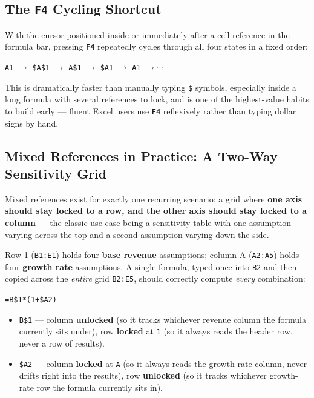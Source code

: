 \documentclass[11pt,a4paper]{article}
\newcommand{\key}[1]{\texttt{\colorbox{black!8}{\textbf{#1}}}}
\begin{document}
\subsection[The F4 Cycling Shortcut]{The \key{F4} Cycling Shortcut}

\begin{protip}
With the cursor positioned inside or immediately after a cell reference in the formula bar, pressing \key{F4} repeatedly cycles through all four states in a fixed order:
\begin{center}
\texttt{A1} $\rightarrow$ \texttt{\$A\$1} $\rightarrow$ \texttt{A\$1} $\rightarrow$ \texttt{\$A1} $\rightarrow$ \texttt{A1} $\rightarrow \cdots$
\end{center}
This is dramatically faster than manually typing \texttt{\$} symbols, especially inside a long formula with several references to lock, and is one of the highest-value habits to build early --- fluent Excel users use \key{F4} reflexively rather than typing dollar signs by hand.
\end{protip}

\subsection{Mixed References in Practice: A Two-Way Sensitivity Grid}

Mixed references exist for exactly one recurring scenario: a grid where \textbf{one axis should stay locked to a row, and the other axis should stay locked to a column} --- the classic use case being a sensitivity table with one assumption varying across the top and a second assumption varying down the side.

\begin{financeapp}
Row 1 (\texttt{B1:E1}) holds four \textbf{base revenue} assumptions; column A (\texttt{A2:A5}) holds four \textbf{growth rate} assumptions. A single formula, typed once into \texttt{B2} and then copied across the \emph{entire} grid \texttt{B2:E5}, should correctly compute \emph{every} combination:
\end{financeapp}

\begin{formulasyntax}
\texttt{=B\$1*(1+\$A2)}
\begin{itemize}
  \item \texttt{B\$1} --- column \textbf{unlocked} (so it tracks whichever revenue column the formula currently sits under), row \textbf{locked} at \texttt{1} (so it always reads the header row, never a row of results).
  \item \texttt{\$A2} --- column \textbf{locked} at \texttt{A} (so it always reads the growth-rate column, never drifts right into the results), row \textbf{unlocked} (so it tracks whichever growth-rate row the formula currently sits in).
\end{itemize}
\end{formulasyntax}
\end{document}
